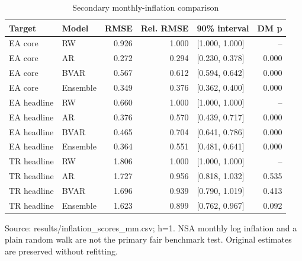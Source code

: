 \begin{table}[htbp]
\centering
\footnotesize
\caption{Secondary monthly-inflation comparison}
\begin{tabularx}{\linewidth}{XlrrXr}
\toprule
Target & Model & RMSE & Rel. RMSE & 90\% interval & DM p \\
\midrule
EA core & RW & 0.926 & 1.000 & [1.000, 1.000] & -- \\
EA core & AR & 0.272 & 0.294 & [0.230, 0.378] & 0.000 \\
EA core & BVAR & 0.567 & 0.612 & [0.594, 0.642] & 0.000 \\
EA core & Ensemble & 0.349 & 0.376 & [0.362, 0.400] & 0.000 \\
EA headline & RW & 0.660 & 1.000 & [1.000, 1.000] & -- \\
EA headline & AR & 0.376 & 0.570 & [0.439, 0.717] & 0.000 \\
EA headline & BVAR & 0.465 & 0.704 & [0.641, 0.786] & 0.000 \\
EA headline & Ensemble & 0.364 & 0.551 & [0.481, 0.641] & 0.000 \\
TR headline & RW & 1.806 & 1.000 & [1.000, 1.000] & -- \\
TR headline & AR & 1.727 & 0.956 & [0.818, 1.032] & 0.535 \\
TR headline & BVAR & 1.696 & 0.939 & [0.790, 1.019] & 0.413 \\
TR headline & Ensemble & 1.623 & 0.899 & [0.762, 0.967] & 0.092 \\
\bottomrule
\end{tabularx}
\par\vspace{3pt}\begin{minipage}{\linewidth}\footnotesize Source: results/inflation\_\allowbreak{}scores\_\allowbreak{}mm.\allowbreak{}csv; h=1.\allowbreak{} NSA monthly log inflation and a plain random walk are not the primary fair benchmark test.\allowbreak{} Original estimates are preserved without refitting.\allowbreak{}\end{minipage}
\end{table}
